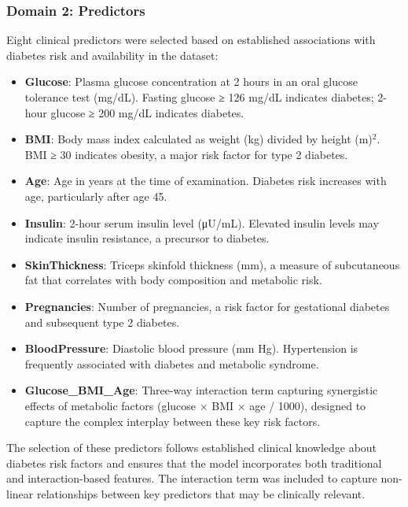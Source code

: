 \subsubsection{Domain 2: Predictors}

Eight clinical predictors were selected based on established associations 
with diabetes risk and availability in the dataset:

\begin{itemize}[leftmargin=*]
    \item \textbf{Glucose}: Plasma glucose concentration at 2 hours in an 
          oral glucose tolerance test (mg/dL). Fasting glucose ≥ 126 mg/dL 
          indicates diabetes; 2-hour glucose ≥ 200 mg/dL indicates diabetes.
    \item \textbf{BMI}: Body mass index calculated as weight (kg) divided 
          by height (m)$^2$. BMI ≥ 30 indicates obesity, a major risk 
          factor for type 2 diabetes.
    \item \textbf{Age}: Age in years at the time of examination. Diabetes 
          risk increases with age, particularly after age 45.
    \item \textbf{Insulin}: 2-hour serum insulin level (μU/mL). Elevated 
          insulin levels may indicate insulin resistance, a precursor to 
          diabetes.
    \item \textbf{SkinThickness}: Triceps skinfold thickness (mm), a 
          measure of subcutaneous fat that correlates with body composition 
          and metabolic risk.
    \item \textbf{Pregnancies}: Number of pregnancies, a risk factor for 
          gestational diabetes and subsequent type 2 diabetes.
    \item \textbf{BloodPressure}: Diastolic blood pressure (mm Hg). 
          Hypertension is frequently associated with diabetes and metabolic 
          syndrome.
    \item \textbf{Glucose\_BMI\_Age}: Three-way interaction term capturing 
          synergistic effects of metabolic factors (glucose × BMI × age / 
          1000), designed to capture the complex interplay between these 
          key risk factors.
\end{itemize}

The selection of these predictors follows established clinical knowledge 
about diabetes risk factors and ensures that the model incorporates 
both traditional and interaction-based features. The interaction term 
was included to capture non-linear relationships between key predictors 
that may be clinically relevant.

